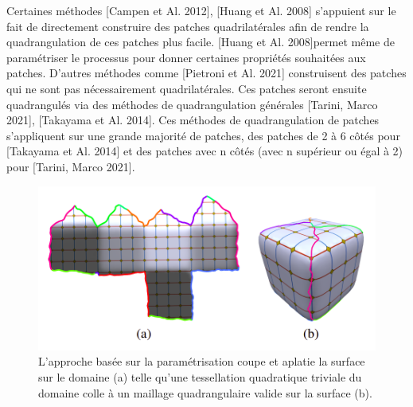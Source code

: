 \documentclass[runningheads]{llncs}
\begin{document}
Certaines méthodes [Campen et Al. 2012]\cite{campen_dual_2012}, [Huang et Al. 2008]\cite{huang_spectral_2008} s’appuient sur le fait de directement construire des patches quadrilatérales afin de rendre la quadrangulation de ces patches plus facile. [Huang et Al. 2008]permet même de paramétriser le processus pour donner certaines propriétés souhaitées aux patches.
D’autres méthodes comme [Pietroni et Al. 2021]\cite{pietroni_reliable_2021} construisent des patches qui ne sont pas nécessairement quadrilatérales. Ces patches seront ensuite quadrangulés via des méthodes de quadrangulation générales [Tarini, Marco 2021]\cite{tarini_closed-form_2021}, [Takayama et Al. 2014]\cite{takayama_pattern-based_2014}. Ces méthodes de quadrangulation de patches s’appliquent sur une grande majorité de patches, des patches de 2 à 6 côtés pour [Takayama et Al. 2014]\cite{takayama_pattern-based_2014} et des patches avec n côtés (avec n supérieur ou égal à 2) pour [Tarini, Marco 2021]\cite{tarini_closed-form_2021}.

\begin{figure}
\includegraphics[width=\textwidth]{img/clement_enerve.png}
\caption{L’approche basée sur la paramétrisation coupe et aplatie la surface sur le domaine (a) telle qu’une tessellation quadratique triviale du domaine colle à un maillage quadrangulaire valide sur la surface (b).} \label{fig1}
\end{figure}
\end{document}
